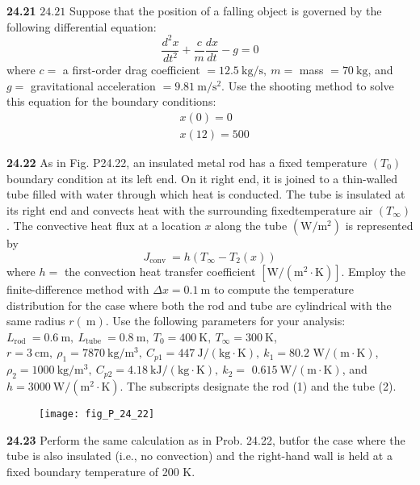 \documentclass[../main.tex]{subfiles}
\begin{document}
\begin{multicols}{2}
    \noindent\textbf{24.21} $24.21$ Suppose that the position of a falling object is governed by the following differential equation:
    $$
    \frac{d^{2} x}{d t^{2}}+\frac{c}{m} \frac{d x}{d t}-g=0
    $$
    where $c=$ a first-order drag coefficient $=12.5 \mathrm{~kg} / \mathrm{s},\ m=$ mass $=70 \mathrm{~kg}$, and $g=$ gravitational acceleration $=9.81 \mathrm{~m} / \mathrm{s}^{2}$. Use the shooting method to solve this equation for the boundary conditions:
    $$
    \begin{aligned}
    &x(0)=0 \\
    &x(12)=500
    \end{aligned}
    $$\vspace{2mm}

    \noindent\textbf{24.22} As in Fig. P24.22, an insulated metal rod has a fixed temperature $\left(T_{0}\right)$ boundary condition at its left end. On it right end, it is joined to a thin-walled tube filled with water through which heat is conducted. The tube is insulated at its right end and convects heat with the surrounding fixedtemperature air $\left(T_{\infty}\right)$. The convective heat flux at a location $x$ along the tube $\left(\mathrm{W} / \mathrm{m}^{2}\right)$ is represented by
    $$
    J_{\text {conv }}=h\left(T_{\infty}-T_{2}(x)\right)
    $$
    where $h=$ the convection heat transfer coefficient $\left[\mathrm{W} /\left(\mathrm{m}^{2} \cdot \mathrm{K}\right)\right]$. Employ the finite-difference method with $\Delta x=0.1 \mathrm{~m}$ to compute the temperature distribution for the case where both the rod and tube are cylindrical with the same radius $r(\mathrm{~m})$. Use the following parameters for your analysis:
    $L_{\text {rod }}=0.6 \mathrm{~m},\ L_{\text {tube }}=0.8 \mathrm{~m},\ T_{0}=400 \mathrm{~K},\ T_{\infty}=300 \mathrm{~K}$, $r=3 \mathrm{~cm},\ \rho_{1}=7870 \mathrm{~kg} / \mathrm{m}^{3},\ C_{p 1}=447 \mathrm{~J} /(\mathrm{kg} \cdot \mathrm{K}),\ k_{1}=80.2$ $\mathrm{W} /(\mathrm{m} \cdot \mathrm{K})$,
    $\rho_{2}=1000 \mathrm{~kg} / \mathrm{m}^{3},\ C_{p 2}=4.18 \mathrm{~kJ} /(\mathrm{kg} \cdot \mathrm{K}),\ k_{2}=$ $0.615 \mathrm{~W} /(\mathrm{m} \cdot \mathrm{K})$, and $h=3000 \mathrm{~W} /\left(\mathrm{m}^{2} \cdot \mathrm{K}\right)$. The subscripts designate the rod (1) and the tube (2).

    \begin{figure}[H]
        \centering
        \texttt{[image: fig\_P\_24\_22]}
       \caption{}\label{fig:fig_P_24_22}
    \end{figure}\vspace{2mm}

    \noindent\textbf{24.23} Perform the same calculation as in Prob. 24.22, butfor the case where the tube is also insulated (i.e., no convection) and the right-hand wall is held at a fixed boundary temperature of 200 K.

    
\end{multicols}
\end{document}
